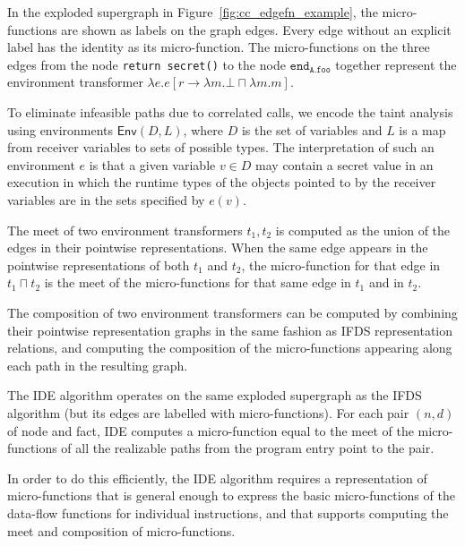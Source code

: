 \begin{example}
    In the exploded supergraph in Figure~\ref{fig:cc_edgefn_example},
    the micro-functions are shown as labels on the graph edges.
    Every edge without an explicit label has the identity as its
    micro-function. The micro-functions on the three edges from
    the node \verb+return secret()+ to the node $\texttt{end}_\texttt{A.foo}$
    together represent the environment transformer 
    $\lambda e.e[r \to \lambda m.\bot \sqcap \lambda m.m]$.

    To eliminate infeasible paths due to correlated calls, we encode the taint
    analysis using environments $\textsf{Env}(D,L)$, where $D$ is the set of
    variables and $L$ is a map from receiver variables to sets of possible
    types. The interpretation of such an environment $e$ is that a given variable
    $v \in D$ may contain a secret value in an execution in which the runtime
    types of the objects pointed to by the receiver variables are in the sets
    specified by $e(v)$.
\end{example}

The meet of two environment transformers $t_1, t_2$ is computed as the union of the edges
in their pointwise representations. When the same edge appears in the pointwise representations of
both $t_1$ and $t_2$, the micro-function for that edge in $t_1 \sqcap t_2$ is the meet of the
micro-functions for that same edge in $t_1$ and in $t_2$.

The composition of two environment transformers can be computed by combining their pointwise
representation graphs in the same fashion as IFDS representation relations, and 
computing the composition of the micro-functions appearing along each path in the resulting graph.

The IDE algorithm operates on the same exploded supergraph as the IFDS algorithm
(but its edges are labelled with micro-functions). For each pair $(n,d)$ of
node and fact, IDE computes a micro-function equal to the meet of the micro-functions
of all the realizable paths from the program entry point to the pair.

In order to do this efficiently, the IDE algorithm requires a representation of micro-functions
that is general enough to express the basic micro-functions of the data-flow functions for individual
instructions, and that supports computing the meet and composition of micro-functions.

